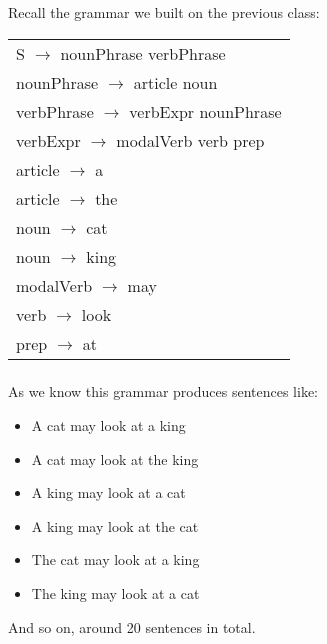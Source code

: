 \begin{frame}
	\frametitle{\insertsection}
	
	Recall the grammar we built on the previous class:
	
	\begin{table}
		\centering
		\begin{tabular}{ l }
			\rowcolor{LightGray} S \(\rightarrow \) nounPhrase verbPhrase \\
			\rowcolor{LightGray} nounPhrase \(\rightarrow \) article noun \\
			\rowcolor{LightGray} verbPhrase \(\rightarrow \) verbExpr nounPhrase \\
			\rowcolor{LightGray} verbExpr \(\rightarrow \) modalVerb verb prep \\
			\rowcolor{LightGray} article \(\rightarrow \) a \\
			\rowcolor{LightGray} article \(\rightarrow \) the \\
			\rowcolor{LightGray} noun \(\rightarrow \) cat \\
			\rowcolor{LightGray} noun \(\rightarrow \) king \\
			\rowcolor{LightGray} modalVerb \(\rightarrow \) may \\
			\rowcolor{LightGray} verb \(\rightarrow \) look \\
			\rowcolor{LightGray} prep \(\rightarrow \) at
		\end{tabular}
	\end{table}

\end{frame}


\begin{frame}
	\frametitle{\insertsection}
	
	As we know this grammar produces sentences like:
	
	\begin{itemize}
		\item A cat may look at a king
		\item A cat may look at the king
		\item A king may look at a cat
		\item A king may look at the cat
		\item The cat may look at a king
		\item The king may look at a cat
	\end{itemize}

	And so on, around 20 sentences in total.
\end{frame}


